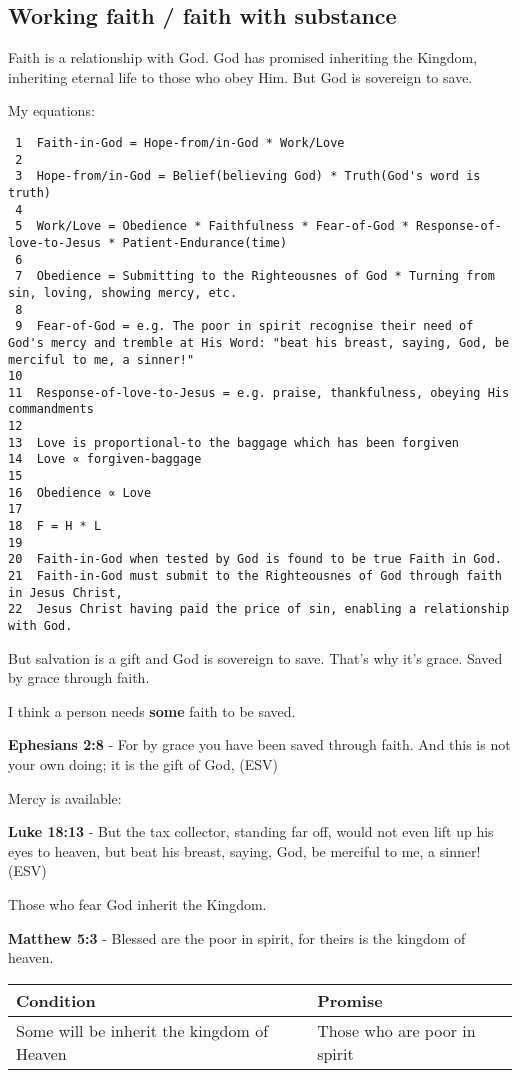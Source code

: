 \documentclass[11pt]{article}
\begin{document}
\subsection{Working faith / faith with substance}
\label{sec:orge1a3c14}

Faith is a relationship with God. God has promised inheriting the Kingdom, inheriting eternal life to those who obey Him. But God is sovereign to save.

My equations:

\begin{verbatim}
 1  Faith-in-God = Hope-from/in-God * Work/Love
 2  
 3  Hope-from/in-God = Belief(believing God) * Truth(God's word is truth)
 4  
 5  Work/Love = Obedience * Faithfulness * Fear-of-God * Response-of-love-to-Jesus * Patient-Endurance(time)
 6  
 7  Obedience = Submitting to the Righteousnes of God * Turning from sin, loving, showing mercy, etc.
 8  
 9  Fear-of-God = e.g. The poor in spirit recognise their need of God's mercy and tremble at His Word: "beat his breast, saying, God, be merciful to me, a sinner!"
10  
11  Response-of-love-to-Jesus = e.g. praise, thankfulness, obeying His commandments
12  
13  Love is proportional-to the baggage which has been forgiven
14  Love ∝ forgiven-baggage
15  
16  Obedience ∝ Love
17  
18  F = H * L
19  
20  Faith-in-God when tested by God is found to be true Faith in God.
21  Faith-in-God must submit to the Righteousnes of God through faith in Jesus Christ,
22  Jesus Christ having paid the price of sin, enabling a relationship with God.
\end{verbatim}

But salvation is a gift and God is sovereign to save.
That's why it's grace.
Saved by grace through faith.

I think a person needs \textbf{some} faith to be saved.

\textbf{Ephesians 2:8} - For by grace you have been saved through faith. And this is not your own doing; it is the gift of God, (ESV)

Mercy is available:

\textbf{Luke 18:13} - But the tax collector, standing far off, would not even lift up his eyes to heaven, but beat his breast, saying, God, be merciful to me, a sinner! (ESV)

Those who fear God inherit the Kingdom.

\textbf{Matthew 5:3} - Blessed are the poor in spirit, for theirs is the kingdom of heaven.

\begin{center}
\begin{tabular}{ll}
Condition & Promise\\[0pt]
\hline
Some will be inherit the kingdom of Heaven & Those who are poor in spirit\\[0pt]
\end{tabular}
\end{center}
\end{document}
